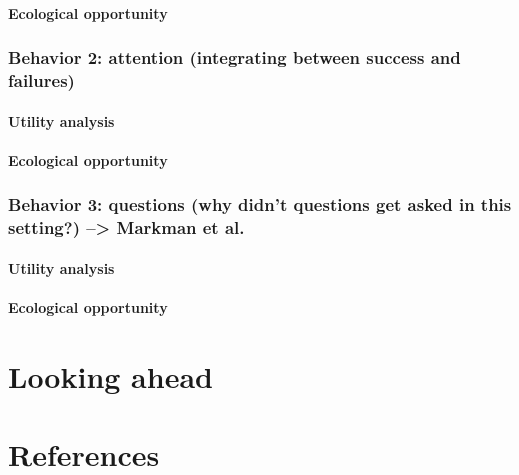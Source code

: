 \documentclass[a4paper,man,apacite,floatsintext]{apa6}
\begin{document}
\paragraph{Ecological opportunity}\label{ecological-opportunity}

\subsubsection{Behavior 2: attention (integrating between success and
failures)}\label{behavior-2-attention-integrating-between-success-and-failures}

\paragraph{Utility analysis}\label{utility-analysis-1}

\paragraph{Ecological opportunity}\label{ecological-opportunity-1}

\subsubsection{Behavior 3: questions (why didn't questions get asked in
this setting?) --\textgreater{} Markman et
al.}\label{behavior-3-questions-why-didnt-questions-get-asked-in-this-setting-markman-et-al.}

\paragraph{Utility analysis}\label{utility-analysis-2}

\paragraph{Ecological opportunity}\label{ecological-opportunity-2}

\section{Looking ahead}\label{looking-ahead}

\newpage

\section{References}\label{references}

\setlength{\parindent}{-0.1in} \setlength{\leftskip}{0.125in} \noindent


\end{document}
